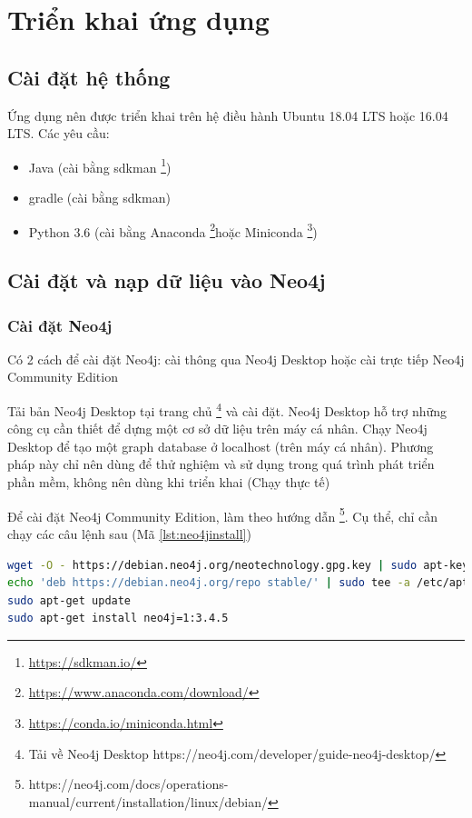 \section{Triển khai ứng dụng}

\subsection{Cài đặt hệ thống}

Ứng dụng nên được triển khai trên hệ điều hành Ubuntu 18.04 LTS hoặc 16.04 LTS. Các yêu cầu: 

\begin{itemize}
\item Java (cài bằng sdkman \footnote{\url{https://sdkman.io/}})
\item gradle (cài bằng sdkman)
\item Python 3.6 (cài bằng Anaconda \footnote{\url{https://www.anaconda.com/download/}}hoặc Miniconda \footnote{\url{https://conda.io/miniconda.html}})
\end{itemize}

\subsection{Cài đặt và nạp dữ liệu vào Neo4j}
\subsubsection{Cài đặt Neo4j} \label{sec:installneo4jinstance}

Có 2 cách để cài đặt Neo4j: cài thông qua Neo4j Desktop hoặc cài trực tiếp Neo4j Community Edition

Tải bản Neo4j Desktop tại trang chủ \footnote{Tải về Neo4j Desktop https://neo4j.com/developer/guide-neo4j-desktop/} và cài đặt. Neo4j Desktop hỗ trợ những công cụ cần thiết để dựng một cơ sở dữ liệu trên máy cá nhân. Chạy Neo4j Desktop để tạo một graph database ở localhost (trên máy cá nhân). Phương pháp này chỉ nên dùng để thử nghiệm và sử dụng trong quá trình phát triển phần mềm, không nên dùng khi triển khai (Chạy thực tế)

Để cài đặt Neo4j Community Edition, làm theo hướng dẫn \footnote{https://neo4j.com/docs/operations-manual/current/installation/linux/debian/}. Cụ thể, chỉ cần chạy các câu lệnh sau (Mã \ref{lst:neo4jinstall})

\begin{lstlisting}[basicstyle=\tiny,language=bash,caption={Cài Neo4j},label={lst:neo4jinstall}]
wget -O - https://debian.neo4j.org/neotechnology.gpg.key | sudo apt-key add -
echo 'deb https://debian.neo4j.org/repo stable/' | sudo tee -a /etc/apt/sources.list.d/neo4j.list
sudo apt-get update
sudo apt-get install neo4j=1:3.4.5
\end{lstlisting}

